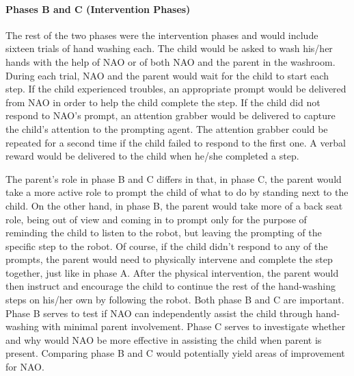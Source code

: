 \documentclass{ut-thesis}
\begin{document}
\paragraph{Phases B and C (Intervention Phases)}
The rest of the two phases were the intervention phases and would include sixteen trials of hand washing each. The child would be asked to wash his/her hands with the help of NAO or of both NAO and the parent in the washroom. During each trial, NAO and the parent would wait for the child to start each step. If the child experienced troubles, an appropriate prompt would be delivered from NAO in order to help the child complete the step. If the child did not respond to NAO's prompt, an attention grabber would be delivered to capture the child's attention to the prompting agent. The attention grabber could be repeated for a second time if the child failed to respond to the first one.  A verbal reward would be delivered to the child when he/she completed a step.

The parent's role in phase B and C differs in that, in phase C, the parent would take a more active role to prompt the child of what to do by standing next to the child.  On the other hand, in phase B, the parent would take more of a back seat role, being out of view and coming in to prompt only for the purpose of reminding the child to listen to the robot, but leaving the prompting of the specific step to the robot.  Of course, if the child didn't respond to any of the prompts, the parent would need to physically intervene and complete the step together, just like in phase A.  After the physical intervention, the parent would then instruct and encourage the child to continue the rest of the hand-washing steps on his/her own by following the robot.  Both phase B and C are important.  Phase B serves to test if NAO can independently assist the child through hand-washing with minimal parent involvement.  Phase C serves to investigate whether and why would NAO be more effective in assisting the child when parent is present.  Comparing phase B and C would potentially yield areas of improvement for NAO.
\end{document}
